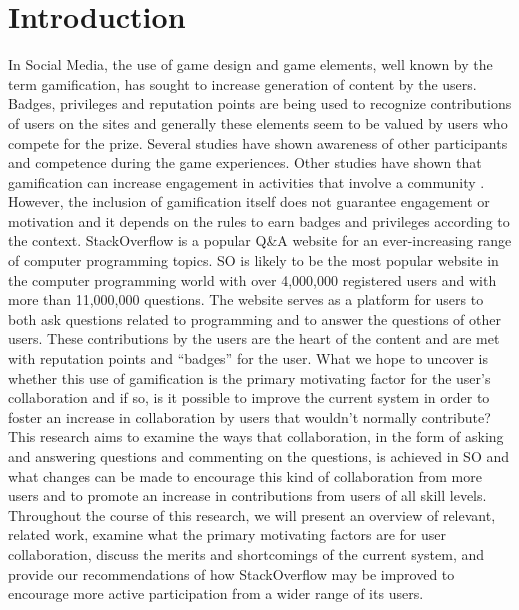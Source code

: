 \documentclass{sigchi}
\begin{document}

 

\section{Introduction}
In Social Media, the use of game design and game elements, well known by the term gamification, has sought to increase generation of content by the users. Badges, privileges and reputation points are being used to recognize contributions of users on the sites and generally these elements seem to be valued by users who compete for the prize. Several studies have shown awareness of other participants and competence during the game experiences\cite{Rughinis}. Other studies have shown that gamification can increase engagement in activities that involve a community \cite{Marder}. However, the inclusion of gamification itself does not guarantee engagement or motivation and it depends on the rules to earn badges and privileges  according to the context\cite{Deterding}.
StackOverflow is a popular Q&A website for an ever-increasing range of computer programming topics. SO is likely to be the most popular website in the computer programming world with over 4,000,000 registered users and with more than 11,000,000 questions. The website serves as a platform for users to both ask questions related to programming and to answer the questions of other users. These contributions by the users are the heart of the content and are met with reputation points and “badges” for the user. What we hope to uncover is whether this use of gamification is the primary motivating factor for the user’s collaboration and if so, is it possible to improve the current system in order to foster an increase in collaboration by users that wouldn’t normally contribute? 
This research aims to examine the ways that collaboration, in the form of asking and answering questions and commenting on the questions, is achieved in SO and what changes can be made to encourage this kind of collaboration from more users and to promote an increase in contributions from users of all skill levels. 
Throughout the course of this research, we will present an overview of relevant, related work, examine what the primary motivating factors are for user collaboration, discuss the merits and shortcomings of the current system, and provide our recommendations of how StackOverflow may be improved to encourage more active participation from a wider range of its users. 
\end{document}
